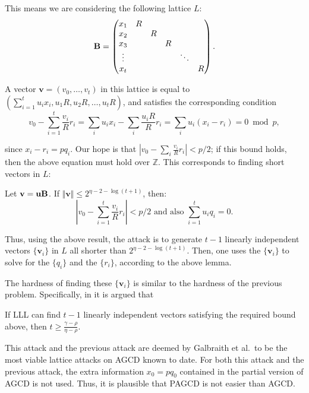         This means we are considering the following lattice $L$:
        \[\textbf{B} = \begin{pmatrix}
        x_1 & R \\
        x_2 & & R \\
        x_3 & & & R \\
        \vdots & & & & \ddots \\
        x_t & & & & & R
        \end{pmatrix}.\]

        A vector $\mathbf{v} = (v_0, \dots, v_t)$ in this lattice is equal to $(\sum_{i = 1}^t u_i x_i, u_1 R, u_2 R, \dots, u_t R)$, and satisfies the corresponding condition
        \[v_0 - \sum_{i = 1}^t \frac{v_i}{R} r_i = \sum_i u_i x_i - \sum_i \frac{u_i R}{R} r_i = \sum_i u_i (x_i - r_i) = 0 \bmod p,\]

        since $x_i - r_i = p q_i$. Our hope is that $\left| v_0 - \sum_i \frac{v_i}{R} r_i \right| < p/2$; if this bound holds, then the above equation must hold over $\mathbb{Z}$. This corresponds to finding short vectors in $L$:
        \begin{lemma}
            Let $\mathbf{v} = \mathbf{u} \textbf{B}$. If $\Vert \mathbf{v} \Vert \leq 2^{\eta - 2 - \log(t + 1)}$, then:
            \[\left| v_0 - \sum_{i = 1}^t \frac{v_i}{R} r_i \right| < p/2 \text{ and also } \sum_{i = 1}^t u_i q_i = 0.\]
        \end{lemma}

        Thus, using the above result, the attack is to generate $t-1$ linearly independent vectors $\{\mathbf{v}_i\}$ in $L$ all shorter than $2^{\eta - 2 - \log(t+1)}$. Then, one uses the $\{\mathbf{v}_i\}$ to solve for the $\{q_i\}$ and the $\{r_i\}$, according to the above lemma.

        The hardness of finding these $\{\mathbf{v}_i\}$ is similar to the hardness of the previous problem. Specifically, in \cite{galbraithalgorithms} it is argued that
        \begin{lemma}
            If LLL can find $t-1$ linearly independent vectors satisfying the required bound above, then $t \geq \frac{\gamma - \rho}{\eta - \rho}$.
        \end{lemma}

        This attack and the previous attack are deemed by Galbraith et al.~to be the most viable lattice attacks on AGCD known to date. For both this attack and the previous attack, the extra information $x_0 = p q_0$ contained in the partial version of AGCD is not used. Thus, it is plausible that PAGCD is not easier than AGCD.

